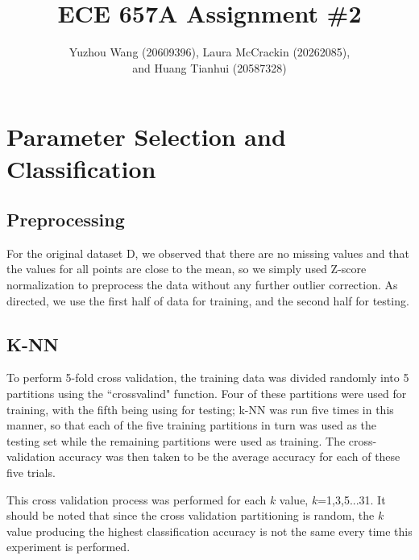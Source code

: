\documentclass[]{article}
\title{ECE 657A Assignment \#2}
\author{Yuzhou Wang (20609396), Laura McCrackin (20262085), \\ and Huang Tianhui (20587328)}
\begin{document}
\maketitle



\section{Parameter Selection and Classification}

\subsection{Preprocessing}

For the original dataset D, we observed that there are no missing values and that the values for all points are close to the mean, so we simply used Z-score normalization to preprocess the data without any further outlier correction. As directed, we use the first half of data for training, and the second half for testing.

\subsection{K-NN}

To perform 5-fold cross validation, the training data was divided randomly into 5 partitions using the ``crossvalind" function.  Four of these partitions were used for training, with the fifth being using for testing; k-NN was run five times in this manner, so that each of the five training partitions in turn was used as the testing set while the remaining partitions were used as training.  The cross-validation accuracy was then taken to be the average accuracy for each of these five trials.

This cross validation process was performed for each $k$ value, $k$=1,3,5...31.  It should be noted that since the cross validation partitioning is random, the $k$ value producing the highest classification accuracy is not the same every time this experiment is performed.  

\end{document}
